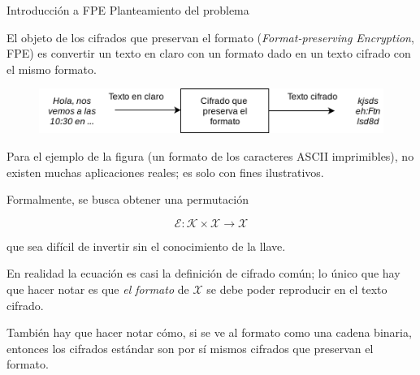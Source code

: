 \begin{frame}{Introducción a FPE}
  {Planteamiento del problema}

  El objeto de los cifrados que preservan el formato
  (\textit{Format-preserving Encryption}, FPE) es convertir un texto en claro
  con un formato dado en un texto cifrado con el mismo formato.

  \begin{figure}[H]
    \begin{center}
      \includegraphics[width=0.75\linewidth]{diagramas/cifrador_formato.png}
    \end{center}
  \end{figure}

  {
    Para el ejemplo de la figura (un formato de los caracteres ASCII
    imprimibles), no existen muchas aplicaciones reales; es solo con
    fines ilustrativos.
  }


  Formalmente, se busca obtener una permutación

  $$ \mathcal{E}: \mathcal{K} \times \mathcal{X} \rightarrow \mathcal{X} $$

  que sea difícil de invertir sin el conocimiento de la llave.

  {
    En realidad la ecuación es casi la definición de cifrado común; lo único
    que hay que hacer notar es que \textit{el formato} de $ \mathcal{X} $
    se debe poder reproducir en el texto cifrado.

    También hay que hacer notar cómo, si se ve al formato como una cadena
    binaria, entonces los cifrados estándar son por sí mismos cifrados que
    preservan el formato.
  }

\end{frame}

